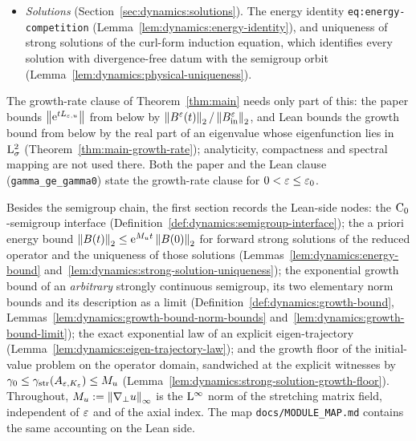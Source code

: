 \begin{itemize}
    embedding $\Hs^2\hookrightarrow\Lp^2$ (Lemma~\ref{lem:dynamics:compact-embedding}); an
    analytic semigroup with compact resolvent is immediately compact
    (Lemma~\ref{lem:dynamics:immediate-compactness}); and for such semigroups a direct
    point-spectrum argument gives the spectral mapping theorem and the equality of the growth
    bound with the spectral bound, attained at an eigenvalue
    (Theorem~\ref{thm:dynamics:spectral-mapping}).  Mean conservation gives
    $0\in\sigma(L_{\eps,u})$ and $\norm{\e^{tL_{\eps,u}}}\geq1$
    (Lemma~\ref{lem:dynamics:mean-conservation}), and the growth bound of every
    $\C_0$-semigroup is a limit (Lemma~\ref{lem:dynamics:growth-bound-limit}).
    Theorem~\ref{thm:dynamics:induction-spectrum} collects the instances at the induction
    semigroup.
  \item \emph{Solutions} (Section~\ref{sec:dynamics:solutions}).  The energy identity
    \texttt{eq:energy-competition} (Lemma~\ref{lem:dynamics:energy-identity}), and uniqueness
    of strong solutions of the curl-form induction equation, which identifies every solution
    with divergence-free datum with the semigroup orbit
    (Lemma~\ref{lem:dynamics:physical-uniqueness}).
\end{itemize}

The growth-rate clause of Theorem~\ref{thm:main} needs only part of this: the paper bounds
$\left\|\mathrm{e}^{tL_{\varepsilon,u}}\right\|$ from below by $\left\|B^\varepsilon(t)\right\|_2/\left\|B_{\rm in}^\varepsilon\right\|_2$, and Lean
bounds the growth bound from below by the real part of an eigenvalue whose eigenfunction lies in
$\mathrm{L}^2_\sigma$ (Theorem~\ref{thm:main-growth-rate}); analyticity, compactness and spectral
mapping are not used there.  Both the paper and the Lean clause (\texttt{gamma\_ge\_gamma0})
state the growth-rate clause for $0<\varepsilon\leq\varepsilon_0$.

Besides the semigroup chain, the first section records the Lean-side nodes: the
$\C_0$-semigroup interface (Definition~\ref{def:dynamics:semigroup-interface}); the a priori
energy bound $\left\|B(t)\right\|_2\leq\mathrm{e}^{M_ut}\left\|B(0)\right\|_2$ for forward strong solutions of the
reduced operator and the uniqueness of those solutions
(Lemmas~\ref{lem:dynamics:energy-bound} and~\ref{lem:dynamics:strong-solution-uniqueness});
the exponential growth bound of an \emph{arbitrary} strongly continuous semigroup, its two
elementary norm bounds and its description as a limit
(Definition~\ref{def:dynamics:growth-bound},
Lemmas~\ref{lem:dynamics:growth-bound-norm-bounds} and~\ref{lem:dynamics:growth-bound-limit});
the exact exponential law of an explicit eigen-trajectory
(Lemma~\ref{lem:dynamics:eigen-trajectory-law}); and the growth floor of the initial-value
problem on the operator domain, sandwiched at the explicit witnesses by
$\gamma_0\leq\gamma_{\rm str}(A_{\varepsilon,K_\varepsilon})\leq M_u$
(Lemma~\ref{lem:dynamics:strong-solution-growth-floor}).  Throughout,
$M_u:=\left\|\nabla_\perp u\right\|_\infty$ is the $\mathrm{L}^\infty$ norm of the stretching matrix field,
independent of $\varepsilon$ and of the axial index.  The map \texttt{docs/MODULE\_MAP.md} contains
the same accounting on the Lean side.

